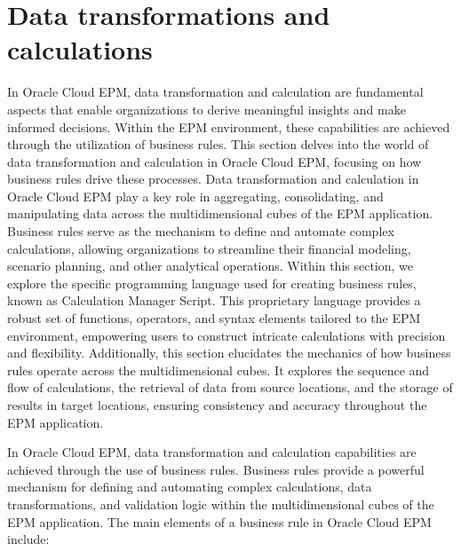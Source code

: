 \documentclass[12pt,a4paper,openright,twoside]{book}
\begin{document}
\section{Data transformations and calculations}

In Oracle Cloud EPM, data transformation and calculation are fundamental aspects that enable organizations to derive meaningful insights and make informed decisions. 
%
Within the EPM environment, these capabilities are achieved through the utilization of business rules.
%
This section delves into the world of data transformation and calculation in Oracle Cloud EPM, focusing on how business rules drive these processes.
%
Data transformation and calculation in Oracle Cloud EPM play a key role in aggregating, consolidating, and manipulating data across the multidimensional cubes of the EPM application.
%
Business rules serve as the mechanism to define and automate complex calculations, allowing organizations to streamline their financial modeling, scenario planning, and other analytical operations.
%
Within this section, we explore the specific programming language used for creating business rules, known as Calculation Manager Script. 
%
This proprietary language provides a robust set of functions, operators, and syntax elements tailored to the EPM environment, empowering users to construct intricate calculations with precision and flexibility.
%
Additionally, this section elucidates the mechanics of how business rules operate across the multidimensional cubes. 
%
It explores the sequence and flow of calculations, the retrieval of data from source locations, and the storage of results in target locations, ensuring consistency and accuracy throughout the EPM application.

In Oracle Cloud EPM, data transformation and calculation capabilities are achieved through the use of business rules. 
%
Business rules provide a powerful mechanism for defining and automating complex calculations, data transformations, and validation logic within the multidimensional cubes of the EPM application.
%
The main elements of a business rule in Oracle Cloud EPM include:
\end{document}

